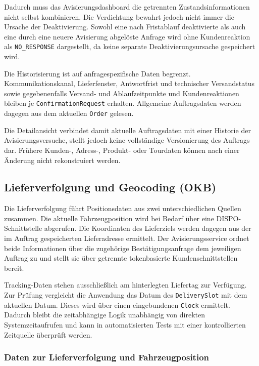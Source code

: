 Dadurch muss das Avisierungsdashboard die getrennten Zustandsinformationen nicht
selbst kombinieren. Die Verdichtung bewahrt jedoch nicht immer die Ursache der
Deaktivierung. Sowohl eine nach Fristablauf deaktivierte als auch eine durch
eine neuere Avisierung abgelöste Anfrage wird ohne Kundenreaktion als
\texttt{NO\_RESPONSE} dargestellt, da keine separate Deaktivierungsursache
gespeichert wird.

Die Historisierung ist auf anfragespezifische Daten begrenzt.
Kommunikationskanal, Lieferfenster, Antwortfrist und technischer Versandstatus
sowie gegebenenfalls Versand- und Ablaufzeitpunkte und Kundenreaktionen bleiben
je \texttt{ConfirmationRequest} erhalten. Allgemeine Auftragsdaten werden
dagegen aus dem aktuellen \texttt{Order} gelesen.

Die Detailansicht verbindet damit aktuelle Auftragsdaten mit einer Historie der
Avisierungsversuche, stellt jedoch keine vollständige Versionierung des
Auftrags dar. Frühere Kunden-, Adress-, Produkt- oder Tourdaten können nach
einer Änderung nicht rekonstruiert werden.

\subsection{Lieferverfolgung und Geocoding (OKB)}
\label{sec:lieferverfolgung}

Die Lieferverfolgung führt Positionsdaten aus zwei
unterschiedlichen Quellen zusammen. Die aktuelle Fahrzeugposition
wird bei Bedarf über eine DISPO-Schnittstelle abgerufen. Die
Koordinaten des Lieferziels werden dagegen aus der im Auftrag
gespeicherten Lieferadresse ermittelt. Der Avisierungsservice
ordnet beide Informationen über die zugehörige
Bestätigungsanfrage dem jeweiligen Auftrag zu und stellt sie über
getrennte tokenbasierte Kundenschnittstellen bereit.

Tracking-Daten stehen ausschließlich am hinterlegten Liefertag
zur Verfügung. Zur Prüfung vergleicht die Anwendung das Datum des
\texttt{DeliverySlot} mit dem aktuellen Datum. Dieses wird über
einen eingebundenen \texttt{Clock} ermittelt. Dadurch bleibt die
zeitabhängige Logik unabhängig von direkten Systemzeitaufrufen und
kann in automatisierten Tests mit einer kontrollierten Zeitquelle
überprüft werden.

\subsubsection{Daten zur Lieferverfolgung und Fahrzeugposition}

